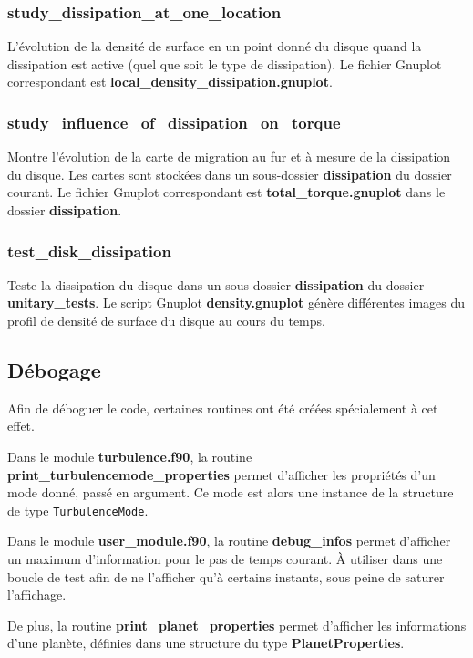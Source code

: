 \subsubsection{study\_dissipation\_at\_one\_location}
L'évolution de la densité de surface en un point donné du disque quand la dissipation est active (quel que soit le type de dissipation). Le fichier Gnuplot correspondant est \textbf{local\_density\_dissipation.gnuplot}. 

\subsubsection{study\_influence\_of\_dissipation\_on\_torque}
Montre l'évolution de la carte de migration au fur et à mesure de la dissipation du disque. Les cartes sont stockées dans un sous-dossier \textbf{dissipation} du dossier courant. Le fichier Gnuplot correspondant est \textbf{total\_torque.gnuplot} dans le dossier \textbf{dissipation}. 


\subsubsection{test\_disk\_dissipation}
Teste la dissipation du disque dans un sous-dossier \textbf{dissipation} du dossier \textbf{unitary\_tests}. Le script Gnuplot \textbf{density.gnuplot} génère différentes images du profil de densité de surface du disque au cours du temps.


\subsection{Débogage}
Afin de déboguer le code, certaines routines ont été créées spécialement à cet effet. 

Dans le module \textbf{turbulence.f90}, la routine \textbf{print\_turbulencemode\_properties} permet d'afficher les propriétés d'un mode donné, passé en argument. Ce mode est alors une instance de la structure de type \texttt{TurbulenceMode}. 

Dans le module \textbf{user\_module.f90}, la routine \textbf{debug\_infos} permet d'afficher un maximum d'information pour le pas de temps courant. À utiliser dans une boucle de test afin de ne l'afficher qu'à certains instants, sous peine de saturer l'affichage. 

De plus, la routine \textbf{print\_planet\_properties} permet d'afficher les informations d'une planète, définies dans une structure du type \textbf{PlanetProperties}.

